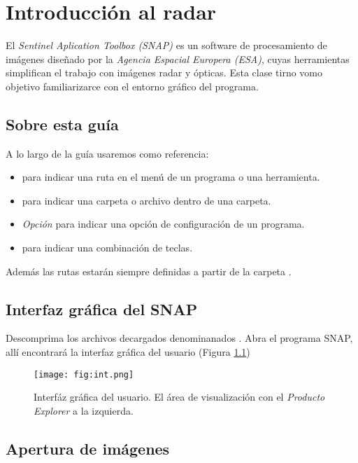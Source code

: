 \chapter{Introducción al radar}

El \emph{Sentinel Aplication Toolbox (SNAP)} es un  software de procesamiento de imágenes diseñado por la \emph{Agencia Espacial Europera (ESA)}, cuyas herramientas simplifican el trabajo con imágenes radar y ópticas.
Esta clase tirno vomo objetivo familiarizarce con el entorno gráfico del programa.

\section{Sobre esta guía}

A lo largo de la guía usaremos como referencia:

\begin{itemize}
  \item {} para indicar una ruta en el menú de un programa o una herramienta.
  \item {} para indicar una carpeta o archivo dentro de una carpeta.
  \item \emph{Opción} para indicar una opción de configuración de un programa.
  \item {} para indicar una combinación de teclas.
\end{itemize}

Además las rutas estarán siempre definidas a partir de la carpeta .

\section{Interfaz gráfica del SNAP}

Descomprima los archivos decargados denominanados . Abra el programa SNAP, allí encontrará la interfaz gráfica del usuario (Figura \ref{fig:int})

\begin{figure}[h!]
    \centering
    \texttt{[image: fig:int.png]}
    \caption{Interfáz gráfica del usuario. El área de visualización con el \emph{Producto Explorer} a la izquierda.}
    \label{fig:int}
\end{figure}

\section{Apertura de imágenes}

